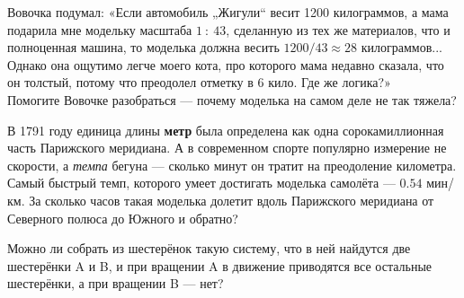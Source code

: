 ﻿
\begin{enumerate}
\itA Вовочка подумал: «Если автомобиль „Жигули“ весит 1200 килограммов, а мама подарила мне модельку масштаба $1\ :\ 43$, сделанную из тех же материалов, что и полноценная машина, то моделька должна весить $1200 / 43 \approx 28$ килограммов... Однако она ощутимо легче моего кота, про которого мама недавно сказала, что он толстый, потому что преодолел отметку в 6 кило. Где же логика?» \smallskip \\
Помогите Вовочке разобраться — почему моделька на самом деле не так тяжела?

\itB В 1791 году единица длины {\bf метр} была определена как одна сорокамиллионная часть Парижского меридиана. А в современном спорте популярно измерение не скорости, а {\it темпа} бегуна — сколько минут он тратит на преодоление километра. \smallskip \\
Самый быстрый темп, которого умеет достигать моделька самолёта — $0.54$ мин/км. За сколько часов такая моделька долетит вдоль Парижского меридиана от Северного полюса до Южного и обратно?

\itC Можно ли собрать из шестерёнок такую систему, что в ней найдутся две шестерёнки A и B, и при вращении A в движение приводятся все остальные шестерёнки, а при вращении B — нет?
\end{enumerate}